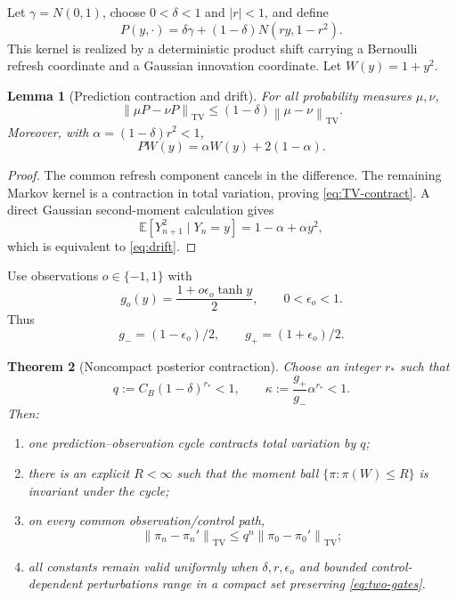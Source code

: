 \documentclass[11pt,reqno]{amsart}
\newtheorem{theorem}{Theorem}[section]
\newtheorem{lemma}[theorem]{Lemma}
\theoremstyle{definition}
\theoremstyle{remark}
\newcommand{\E}{\mathbb E}
\newcommand{\TV}{\mathrm{TV}}
\newcommand{\norm}[1]{\left\lVert #1\right\rVert}
\newcommand{\abs}[1]{\left\lvert #1\right\rvert}
\begin{document}
Let $\gamma=N(0,1)$, choose $0<\delta<1$ and $\abs r<1$, and define
\begin{equation}\label{eq:refresh-kernel}
 P(y,\cdot)=\delta\gamma
 +(1-\delta)N(ry,1-r^2).
\end{equation}
This kernel is realized by a deterministic product shift carrying a Bernoulli
refresh coordinate and a Gaussian innovation coordinate.  Let
$W(y)=1+y^2$.

\begin{lemma}[Prediction contraction and drift]\label{lem:refresh}
For all probability measures $\mu,\nu$,
\begin{equation}\label{eq:TV-contract}
 \norm{\mu P-\nu P}_{\TV}
 \le(1-\delta)\norm{\mu-\nu}_{\TV}.
\end{equation}
Moreover, with $\alpha=(1-\delta)r^2<1$,
\begin{equation}\label{eq:drift}
 PW(y)=\alpha W(y)+2(1-\alpha).
\end{equation}
\end{lemma}

\begin{proof}
The common refresh component cancels in the difference.  The remaining
Markov kernel is a contraction in total variation, proving
\eqref{eq:TV-contract}.  A direct Gaussian second-moment calculation gives
\[
 \E[Y_{n+1}^2\mid Y_n=y]
 =1-\alpha+\alpha y^2,
\]
which is equivalent to \eqref{eq:drift}.
\end{proof}

Use observations $o\in\{-1,1\}$ with
\begin{equation}\label{eq:likelihood}
 g_o(y)=\frac{1+o\epsilon_o\tanh y}{2},
 \qquad0<\epsilon_o<1.
\end{equation}
Thus
\[
 g_-=(1-\epsilon_o)/2,
 \qquad g_+=(1+\epsilon_o)/2.
\]

\begin{theorem}[Noncompact posterior contraction]\label{thm:noncompact-filter}
Choose an integer $r_*$ such that
\begin{equation}\label{eq:two-gates}
 q:=C_B(1-\delta)^{r_*}<1,
 \qquad
 \kappa:=\frac{g_+}{g_-}\alpha^{r_*}<1.
\end{equation}
Then:
\begin{enumerate}[label=(\roman*)]
\item one prediction--observation cycle contracts total variation by $q$;
\item there is an explicit $R<\infty$ such that the moment ball
$\{\pi:\pi(W)\le R\}$ is invariant under the cycle;
\item on every common observation/control path,
\[
 \norm{\pi_n-\pi_n'}_{\TV}
 \le q^n\norm{\pi_0-\pi_0'}_{\TV};
\]
\item all constants remain valid uniformly when $\delta,r,\epsilon_o$ and
bounded control-dependent perturbations range in a compact set preserving
\eqref{eq:two-gates}.
\end{enumerate}
\end{theorem}
\end{document}
